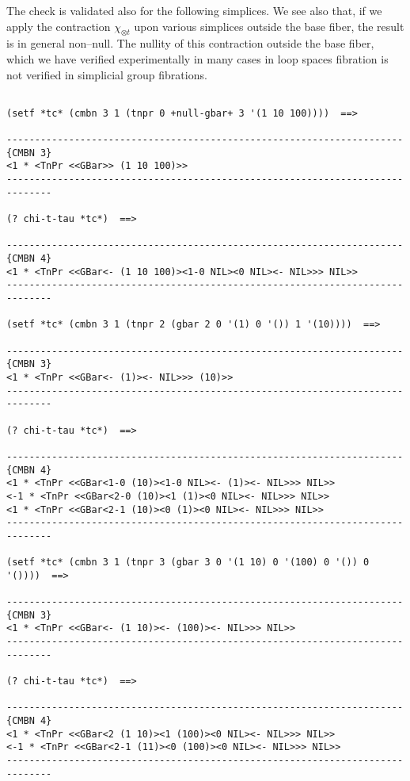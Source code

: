 The check is validated also for the following simplices. We see also that,
if we apply the contraction $\chi_{\otimes t}$ upon various simplices outside the base fiber, the
result is in general non--null. The nullity of this contraction  outside
the base fiber, which we have verified experimentally in many cases in  loop spaces fibration 
is not verified in  simplicial group fibrations.
{\footnotesize\begin{verbatim}

(setf *tc* (cmbn 3 1 (tnpr 0 +null-gbar+ 3 '(1 10 100))))  ==>

----------------------------------------------------------------------{CMBN 3}
<1 * <TnPr <<GBar>> (1 10 100)>>
------------------------------------------------------------------------------

(? chi-t-tau *tc*)  ==>

----------------------------------------------------------------------{CMBN 4}
<1 * <TnPr <<GBar<- (1 10 100)><1-0 NIL><0 NIL><- NIL>>> NIL>>
------------------------------------------------------------------------------

(setf *tc* (cmbn 3 1 (tnpr 2 (gbar 2 0 '(1) 0 '()) 1 '(10))))  ==>

----------------------------------------------------------------------{CMBN 3}
<1 * <TnPr <<GBar<- (1)><- NIL>>> (10)>>
------------------------------------------------------------------------------

(? chi-t-tau *tc*)  ==>

----------------------------------------------------------------------{CMBN 4}
<1 * <TnPr <<GBar<1-0 (10)><1-0 NIL><- (1)><- NIL>>> NIL>>
<-1 * <TnPr <<GBar<2-0 (10)><1 (1)><0 NIL><- NIL>>> NIL>>
<1 * <TnPr <<GBar<2-1 (10)><0 (1)><0 NIL><- NIL>>> NIL>>
------------------------------------------------------------------------------

(setf *tc* (cmbn 3 1 (tnpr 3 (gbar 3 0 '(1 10) 0 '(100) 0 '()) 0 '())))  ==>

----------------------------------------------------------------------{CMBN 3}
<1 * <TnPr <<GBar<- (1 10)><- (100)><- NIL>>> NIL>>
------------------------------------------------------------------------------

(? chi-t-tau *tc*)  ==>

----------------------------------------------------------------------{CMBN 4}
<1 * <TnPr <<GBar<2 (1 10)><1 (100)><0 NIL><- NIL>>> NIL>>
<-1 * <TnPr <<GBar<2-1 (11)><0 (100)><0 NIL><- NIL>>> NIL>>
------------------------------------------------------------------------------


\end{verbatim}}
